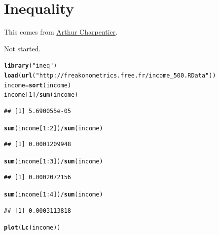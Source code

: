 \documentclass[12pt, a4paper, oneside]{article}\usepackage[]{graphicx}\usepackage[]{color}
\makeatletter
\newcommand{\hlnum}[1]{\textcolor[rgb]{0.686,0.059,0.569}{#1}}%
\newcommand{\hlstr}[1]{\textcolor[rgb]{0.192,0.494,0.8}{#1}}%
\newcommand{\hlopt}[1]{\textcolor[rgb]{0,0,0}{#1}}%
\newcommand{\hlstd}[1]{\textcolor[rgb]{0.345,0.345,0.345}{#1}}%
\newcommand{\hlkwb}[1]{\textcolor[rgb]{0.69,0.353,0.396}{#1}}%
\newcommand{\hlkwd}[1]{\textcolor[rgb]{0.737,0.353,0.396}{\textbf{#1}}}%
\newenvironment{kframe}{%
 \def\at@end@of@kframe{}%
 \ifinner\ifhmode%
  \def\at@end@of@kframe{\end{minipage}}%
  \begin{minipage}{\columnwidth}%
 \fi\fi%
 \def\FrameCommand##1{\hskip\@totalleftmargin \hskip-\fboxsep
 \colorbox{shadecolor}{##1}\hskip-\fboxsep
     \hskip-\linewidth \hskip-\@totalleftmargin \hskip\columnwidth}%
 \MakeFramed {\advance\hsize-\width
   \@totalleftmargin\z@ \linewidth\hsize
   \@setminipage}}%
 {\par\unskip\endMakeFramed%
 \at@end@of@kframe}
\newenvironment{knitrout}{}{} %
\makeatother
\begin{document}
 
\section{Inequality}
This comes from \href{http://freakonometrics.hypotheses.org/18858}{Arthur Charpentier}.  

Not started. 
\begin{knitrout}
\color{fgcolor}\begin{kframe}
\begin{alltt}
\hlkwd{library}\hlstd{(}\hlstr{"ineq"}\hlstd{)}
\hlkwd{load}\hlstd{(}\hlkwd{url}\hlstd{(}\hlstr{"http://freakonometrics.free.fr/income_500.RData"}\hlstd{))}
\hlstd{income} \hlkwb{=} \hlkwd{sort}\hlstd{(income)}
\hlstd{income[}\hlnum{1}\hlstd{]}\hlopt{/}\hlkwd{sum}\hlstd{(income)}
\end{alltt}
\begin{verbatim}
## [1] 5.690055e-05
\end{verbatim}
\begin{alltt}
\hlkwd{sum}\hlstd{(income[}\hlnum{1}\hlopt{:}\hlnum{2}\hlstd{])}\hlopt{/}\hlkwd{sum}\hlstd{(income)}
\end{alltt}
\begin{verbatim}
## [1] 0.0001209948
\end{verbatim}
\begin{alltt}
\hlkwd{sum}\hlstd{(income[}\hlnum{1}\hlopt{:}\hlnum{3}\hlstd{])}\hlopt{/}\hlkwd{sum}\hlstd{(income)}
\end{alltt}
\begin{verbatim}
## [1] 0.0002072156
\end{verbatim}
\begin{alltt}
\hlkwd{sum}\hlstd{(income[}\hlnum{1}\hlopt{:}\hlnum{4}\hlstd{])}\hlopt{/}\hlkwd{sum}\hlstd{(income)}
\end{alltt}
\begin{verbatim}
## [1] 0.0003113818
\end{verbatim}
\begin{alltt}
\hlkwd{plot}\hlstd{(}\hlkwd{Lc}\hlstd{(income))}
\end{alltt}
\end{kframe}

\end{knitrout}
\end{document}
